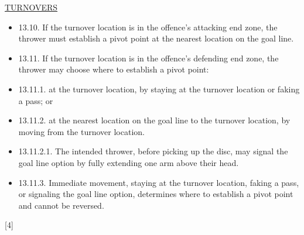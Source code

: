 \begin{center}\underline{\uppercase{turnovers}}\end{center}

    \begin{itemize}[noitemsep]
    \tiny
    \item 13.10. If the turnover location is in the offence’s attacking end zone, the thrower must establish a pivot point at the nearest location on the goal line.
    \item 13.11. If the turnover location is in the offence’s defending end zone, the thrower may choose where to establish a pivot point:
    \item 13.11.1. at the turnover location, by staying at the turnover location or faking a pass; or
    \item 13.11.2. at the nearest location on the goal line to the turnover location, by moving from the turnover location.
    \item 13.11.2.1. The intended thrower, before picking up the disc, may signal the goal line option by fully extending one arm above their head.
    \item 13.11.3. Immediate movement, staying at the turnover location, faking a pass, or signaling the goal line option, determines where to establish a pivot point and cannot be reversed.
\end{itemize}


\begin{center}[4]\end{center}
